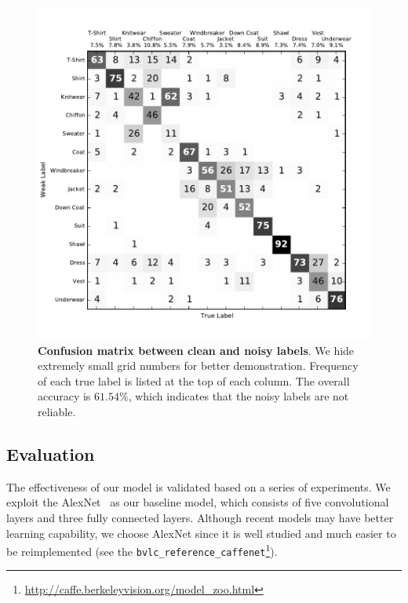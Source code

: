 \documentclass[10pt,twocolumn,letterpaper]{article}
\begin{document}
\begin{figure}[t]
\begin{center}
\includegraphics[width=1.0\linewidth]{figure/cm_strong_weak_labels.pdf}
\end{center}
\caption{\textbf{Confusion matrix between clean and noisy labels}. We hide extremely small grid numbers for better demonstration. Frequency of each true label is listed at the top of each column. The overall accuracy is $61.54\%$, which indicates that the noisy labels are not reliable.}
\label{fig:cm_strong_weak}
\end{figure}


\subsection{Evaluation} %
\label{sub:evaluation}
The effectiveness of our model is validated based on a series of experiments. We exploit the AlexNet~\cite{krizhevsky2012imagenet} as our baseline model, which consists of five convolutional layers and three fully connected layers. Although recent models may have better learning capability, we choose AlexNet since it is well studied and much easier to be reimplemented (see the \texttt{bvlc\_reference\_caffenet}\footnote{\url{http://caffe.berkeleyvision.org/model_zoo.html}}).
\end{document}
